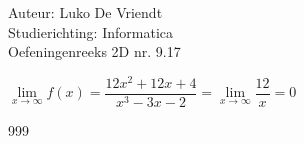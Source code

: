 \documentclass[a4paper]{article}
\begin{document}
\noindent \large Auteur: Luko De Vriendt\\
\noindent \large Studierichting: Informatica\\
\noindent \large Oefeningenreeks 2D nr. 9.17\\

\medskip

\normalsize


$\lim\limits_{x \rightarrow \infty} f(x) = \dfrac{12x^2 + 12x + 4}{x^3 - 3x - 2} = \lim\limits_{x \rightarrow \infty} \dfrac{12}{x} = 0$ \\


\begin{thebibliography}{999}
\end{thebibliography}
\end{document}

